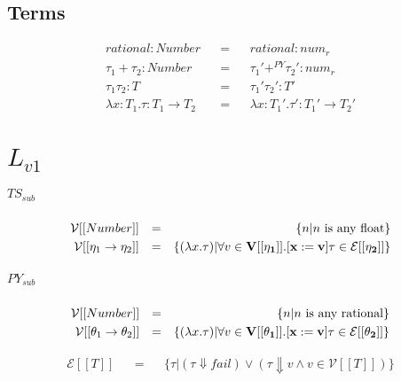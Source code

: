 \documentclass{article}
\begin{document}
	\subsection{Terms}
	\begin{align*}
	rational: Number						 && = && rational: num_r\\
	\tau_1 + \tau_2: Number					 && = && \tau_1' +^{PY} \tau_2': num_r\\
	\tau_1 \tau_2: T						 && = && \tau_1' \tau_2': T'\\
	\lambda x: T_1.\tau: T_1 \rightarrow T_2 && = && \lambda x: T_1'.\tau': T_1' \rightarrow T_2'
	\end{align*}


	\section{$L_{v1}$}
	
	\subparagraph{$TS_{sub}$}
	\begin{align*}
		\mathcal{V}[[Number]]				&& = && \{ n| n \text{ is any float}\}\\
		\mathcal{V}[[\eta_1 \rightarrow \eta_2]]	&& = && \{ 
				(\lambda x.\tau)| 
				\forall v \in \bf{V}[[\eta_1]].[x:=v]\tau \in \mathcal{E}[[\eta_2]]
		\}
	\end{align*}
	
	\subparagraph{$PY_{sub}$}
	\begin{align*}
		\mathcal{V}[[Number]]				&& = && \{ n| n \text{ is any rational}\}\\
		\mathcal{V}[[\theta_1 \rightarrow \theta_2]]	&& = && \{ 
		(\lambda x.\tau)| 
		\forall v \in \bf{V}[[\theta_1]].[x:=v]\tau \in \mathcal{E}[[\theta_2]]
		\}
	\end{align*}
	
	\begin{align*}
		\mathcal{E}[[T]] && = && \{
		\tau | (\tau \Downarrow fail) \lor
		(\tau \Downarrow v \land v \in \mathcal{V}[[T]])
	\}
	\end{align*}
\end{document}
